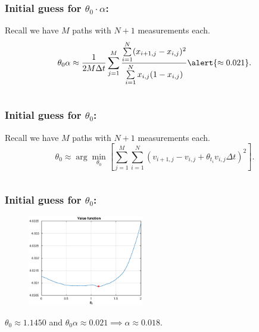 \documentclass[aspectratio=169]{beamer}\usepackage[utf8]{inputenc}
\begin{document}
\begin{frame}\frametitle{Initial guess for $\theta_0\cdot\alpha$:}
Recall we have $M$ paths with $N+1$ measurements each.
\begin{equation*}
\theta_0 \alpha\approx \frac{1}{2M\Delta t} \sum\limits_{j=1}^M \frac{ \sum\limits_{i=1}^{N} (x_{i+1,j}  - x_{i,j})^2}{\sum\limits_{i=1}^{N} x_{i,j}(1-x_{i,j}) }\alert{\approx 0.021}.
\end{equation*}

\begin{center}
\begin{tabular}{|c|}
\toprule
{\tiny

}\\
\bottomrule
\end{tabular}
\end{center}

\end{frame}


\begin{frame}\frametitle{Initial guess for $\theta_0$:}
Recall we have $M$ paths with $N+1$ measurements each.
\begin{equation*}
\theta_0\approx\arg\min_{\theta_0}\left[\sum_{j=1}^M\sum_{i=1}^N\left(v_{i+1,j}-v_{i,j}+\theta_{t_i}v_{i,j}\Delta t\right)^2\right].
\end{equation*}

\begin{center}
\begin{tabular}{|c|}
\toprule
{\tiny

}\\
\bottomrule
\end{tabular}
\end{center}

\end{frame}


\begin{frame}\frametitle{Initial guess for $\theta_0$:}

\begin{figure}[ht!]
\centering
\includegraphics[width=0.45\textwidth]{theta_0.eps}
\end{figure}

\alert{$\theta_0\approx 1.1450
$ and $\theta_0\alpha\approx 0.021\implies\alpha\approx0.018$.}

\end{frame}
\end{document}
